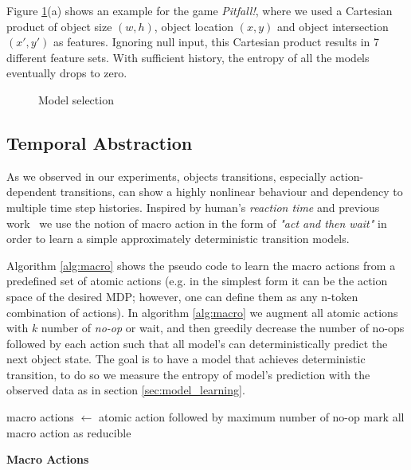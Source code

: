 Figure \ref{fig:pitfall:metaction}(a) shows an example for the game \textit{Pitfall!}, where we used a Cartesian product of object size $(w,h)$, object location $(x,y)$ and object intersection $(x',y')$ as features. Ignoring null input, this Cartesian product results in 7 different feature sets. With sufficient history, the entropy of all the models eventually drops to zero. 

\begin{figure}[tb]
    \centering

    \quad
    \quad
    \caption{Model selection}%
    
    \label{fig:pitfall:metaction}%
\end{figure}

\subsection{Temporal Abstraction}\label{sec:macro}

As we observed in our experiments, objects transitions, especially action-dependent transitions, can show a highly nonlinear behaviour and dependency to multiple time step histories. Inspired by human's \textit{reaction time} and previous work~\citep{diuk2008object} we use the notion of macro action in the form of \textit{"act and then wait"} in order to learn a simple approximately deterministic transition models. 

Algorithm \ref{alg:macro} shows the pseudo code to learn the macro actions from a predefined set of atomic actions (e.g. in the simplest form it can be the action space of the desired MDP; however, one can define them as any n-token combination of actions). In algorithm \ref{alg:macro} we augment all atomic actions with $k$ number of \textit{no-op} or wait, and then greedily decrease the number of no-ops followed by each action such that all model's can deterministically predict the next object state. The  goal is to have a model that achieves deterministic transition, to do so we measure the entropy of model's prediction with the observed data as in section \ref{sec:model_learning}.

\begin{algorithm}
\SetAlgoLined
macro actions $\gets$ atomic action followed by maximum number of no-op\;
mark all macro action as reducible\;
 \caption{\bf Macro Actions}\label{alg:macro}
\end{algorithm}

